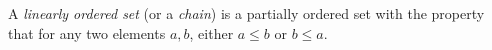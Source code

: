 A \textit{linearly ordered set} (or a \textit{chain}) is a partially ordered set with the property that for any two elements $a, b$, either $a \leq b$ or $b \leq a$.

